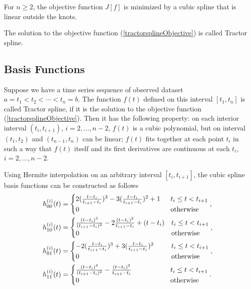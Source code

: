 \begin{theorem}
For $n\geq2$, the objective function $J[f]$ is minimized by a cubic spline that is linear outside the knots.
\end{theorem}
The solution to the objective function (\ref{tractorsplineObjective}) is called Tractor spline.


\subsection{Basis Functions}
Suppose we have a time series sequence of observed dataset $a=t_1<t_2<\cdots<t_n=b$. The function $f(t)$ %
defined on this interval $[t_1,t_n]$ is called Tractor spline, if it is the solution to the objective function (\ref{tractorsplineObjective}). Then it has the following property: on each interior interval $(t_i,t_{i+1})$, $i=2,\ldots,n-2$, $f(t)$ is a cubic polynomial, but on interval $(t_1,t_2)$ and $(t_{n-1},t_n)$ can be linear; $f(t)$ fits together at each point $t_i$ in such a way that $f(t)$ itself and its first derivatives are continuous at each $t_i$,  $i=2,\ldots,n-2$. 

Using Hermite interpolation on an arbitrary interval $[t_i,t_{i+1}]$, the cubic spline basis functions can be constructed as follows
\begin{align}\label{hermitebasis1}
& h_{00}^{(i)}(t)=
\begin{cases}
2(\frac{t-t_{i}}{t_{i+1}-t_{i}})^3-3(\frac{t-t_{i}}{t_{i+1}-t_{i}})^2+1 \hphantom{1} & t_i\leq t<t_{i+1} \\ 
0 & \mbox{otherwise}
\end{cases}, \\
& h_{10}^{(i)}(t)=\begin{cases}
\frac{(t-t_{i})^3}{(t_{i+1}-t_{i})^2}-2\frac{(t-t_{i})^2}{t_{i+1}-t_{i}}+(t-t_{i})   & t_i\leq t<t_{i+1} \\ 
0 &   \mbox{otherwise}
\end{cases},\\
& h_{01}^{(i)}(t)=
\begin{cases}
-2(\frac{t-t_i}{t_{i+1}-t_i})^3+3(\frac{t-t_i}{t_{i+1}-t_i})^2 \hphantom{+1.} & t_i\leq t<t_{i+1} \\ 
0 &   \mbox{otherwise}
\end{cases},\\
& h_{11}^{(i)}(t)=\begin{cases}
\frac{(t-t_i)^3}{(t_{i+1}-t_i)^2}-\frac{(t-t_i)^2}{t_{i+1}-t_i}  \hphantom{+t-123-}  & t_i\leq t<t_{i+1} \\ 
0 &   \mbox{otherwise}
\end{cases}.
\end{align}


